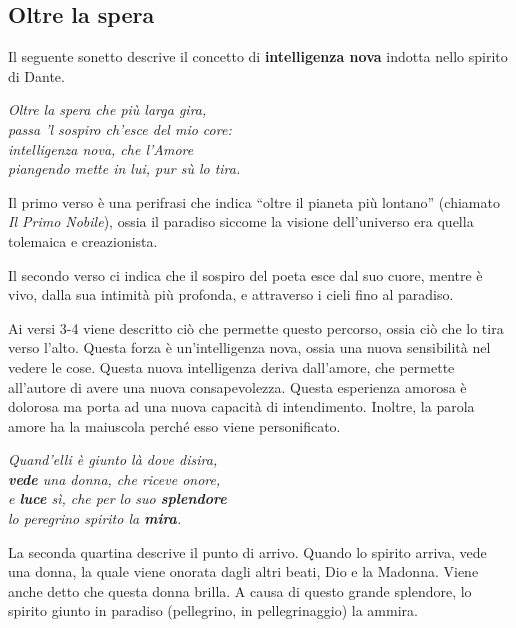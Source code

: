 \documentclass[a4paper]{article}
\newcommand{\quotes}[1]{``#1''}
\begin{document}
\subsection{Oltre la spera}

Il seguente sonetto descrive il concetto di \textbf{intelligenza nova}
indotta nello spirito di Dante.

\begin{center}
    \textit{Oltre la spera che più larga gira,} \\
    \textit{passa 'l sospiro ch'esce del mio core:} \\
    \textit{intelligenza nova, che l'Amore} \\
    \textit{piangendo mette in lui, pur sù lo tira.}
\end{center}

Il primo verso è una perifrasi che indica \quotes{oltre il pianeta più lontano} (chiamato \textit{Il Primo Nobile}), ossia il paradiso
siccome la visione dell'universo era quella tolemaica e creazionista.

Il secondo verso ci indica che il sospiro del poeta esce dal suo cuore, mentre è vivo, dalla sua intimità più profonda,
e attraverso i cieli fino al paradiso.  

Ai versi 3-4 viene descritto ciò che permette questo percorso, ossia ciò che lo tira
verso l'alto. Questa forza è un'intelligenza nova, ossia una nuova sensibilità nel vedere le cose.
Questa nuova intelligenza deriva dall'amore, che permette all'autore di avere una nuova consapevolezza.
Questa esperienza amorosa è dolorosa ma porta ad una nuova capacità di intendimento.
Inoltre, la parola amore ha la maiuscola perché esso viene personificato.

\begin{center}
    \textit{Quand'elli è giunto là dove disira,} \\
    \textit{\textbf{vede} una donna, che riceve onore,} \\
    \textit{e \textbf{luce} sì, che per lo suo \textbf{splendore}} \\
    \textit{lo peregrino spirito la \textbf{mira}.}
\end{center}

La seconda quartina descrive il punto di arrivo.
Quando lo spirito arriva, vede una donna, la quale viene onorata dagli altri beati, Dio e la Madonna.
Viene anche detto che questa donna brilla.
A causa di questo grande splendore, lo spirito giunto in paradiso (pellegrino, in pellegrinaggio) la ammira.
\end{document}
